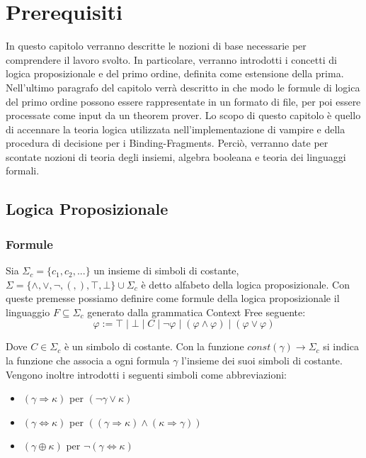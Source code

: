\documentclass[./main.tex]{subfiles}
\begin{document}
\chapter{Prerequisiti}

In questo capitolo verranno descritte le nozioni di base necessarie 
per comprendere il lavoro svolto. 
In particolare, verranno introdotti i concetti di logica proposizionale e 
del primo ordine, definita come estensione della prima. Nell'ultimo paragrafo del capitolo 
verrà descritto in che modo le formule di logica del 
primo ordine possono essere rappresentate in un formato di file, per poi essere 
processate come input da un theorem prover. 
Lo scopo di questo capitolo è quello di accennare la teoria logica utilizzata nell'implementazione di vampire 
e della procedura di decisione per i Binding-Fragments. Perciò, verranno date per scontate nozioni di teoria degli insiemi,
algebra booleana e teoria dei linguaggi formali.



\section{Logica Proposizionale}

\subsection{Formule}
Sia $\Sigma_c = \{c_1, c_2, ...\}$ un insieme di simboli di costante, 
$\Sigma = \{ \land, \lor, \lnot, (, ), \top, \bot\} \cup \Sigma_c$ è detto alfabeto della logica proposizionale. 
Con queste premesse possiamo definire come formule della logica proposizionale il linguaggio $F \subseteq \Sigma_c$ generato dalla
grammatica Context Free seguente:
$$
\varphi  := \top \mid \bot \mid C \mid \lnot \varphi \mid (\varphi \land \varphi) \mid (\varphi \lor \varphi)
$$

Dove $C \in \Sigma_c$ è un simbolo di costante. Con la funzione $const(\gamma) \rightarrow \Sigma_c$ si indica la funzione che
associa a ogni formula $\gamma$ l'insieme dei suoi simboli di costante.
Vengono inoltre introdotti i seguenti simboli come abbreviazioni:

\begin{itemize}
    \item $(\gamma \Rightarrow \kappa)$ per $(\lnot \gamma \lor \kappa)$
    \item $(\gamma \Leftrightarrow \kappa)$ per $((\gamma \Rightarrow \kappa) \land (\kappa \Rightarrow \gamma))$
    \item $(\gamma \oplus \kappa)$ per $\lnot(\gamma \Leftrightarrow \kappa)$
\end{itemize}
\end{document}

